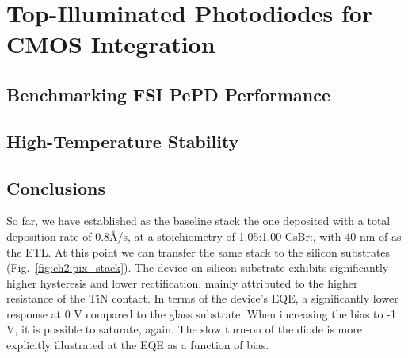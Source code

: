\chapter{Top-Illuminated Photodiodes for CMOS Integration}\label{ch:top_illuminated}

\section{Benchmarking FSI PePD Performance}

\section{High-Temperature Stability}

\section{Conclusions}


So far, we have established as the baseline stack the one deposited with a total deposition rate of 0.8{\AA}/s, at a stoichiometry of 1.05:1.00 CsBr:, with 40 nm of  as the ETL. At this point we can transfer the same stack to the silicon substrates (Fig.~\ref{fig:ch2:pix_stack}). 
The device on silicon substrate exhibits significantly higher hysteresis and lower rectification, mainly attributed to the higher resistance of the TiN contact. In terms of the device's EQE, a significantly lower response at 0 V compared to the glass substrate. When increasing the bias to -1 V, it is possible to saturate, again. The slow turn-on of the diode is more explicitly illustrated at the EQE as a function of bias. 




